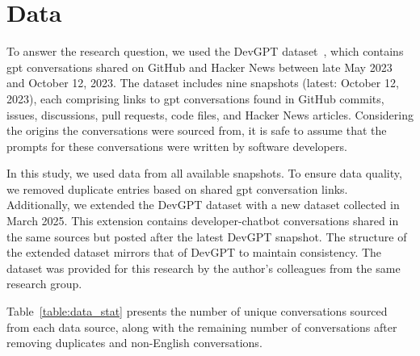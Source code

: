 \chapter{Data}\label{sec:data}
To answer the research question, we used the DevGPT dataset~\cite{devgpt}, which contains \acrshort{gpt} conversations shared on GitHub and Hacker News between late May 2023 and October 12, 2023. The dataset includes nine snapshots (latest: October 12, 2023), each comprising links to \acrshort{gpt} conversations found in GitHub commits, issues, discussions, pull requests, code files, and Hacker News articles. Considering the origins the conversations were sourced from, it is safe to assume that the prompts for these conversations were written by software developers.

In this study, we used data from all available snapshots. To ensure data quality, we removed duplicate entries based on shared \acrshort{gpt} conversation links. Additionally, we extended the DevGPT dataset with a new dataset collected in March 2025. This extension contains developer-chatbot conversations shared in the same sources but posted after the latest DevGPT snapshot. The structure of the extended dataset mirrors that of DevGPT to maintain consistency. The dataset was provided for this research by the author's colleagues from the same research group.

Table~\ref{table:data_stat} presents the number of unique conversations sourced from each data source, along with the remaining number of conversations after removing duplicates and non-English conversations.

\begin{table}[h]
    \centering
    \caption{Number of conversations collected from different sources after all the duplicates (DR) and non-English conversations (NE) were removed from the data.}
    \label{table:data_stat}
\end{table}

